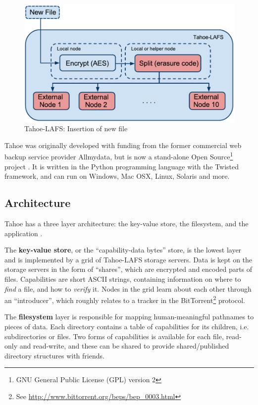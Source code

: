 \documentclass[english,12pt,a4paper]{book}
\begin{document}
\begin{figure}[h!]
    \centering
    \includegraphics[width=0.9\columnwidth]{Tahoe-newfile.pdf}
    \caption{Tahoe-LAFS: Insertion of new file}
    \label{fig:tahoeinsertion}
\end{figure}

Tahoe was originally developed with funding from the former commercial web
backup service provider Allmydata, but is now a stand-alone Open
Source\footnote{GNU General Public License (GPL) version 2} project
\cite{t_ars}.  It is written in the Python programming language with the Twisted
framework, and can run on Windows, Mac OSX, Linux, Solaris and more.

\subsection{Architecture}

Tahoe has a three layer architecture: the key-value store, the filesystem, and
the application \cite{t_tahoe}.

The \textbf{key-value store}, or the ``capability-data bytes'' store, is the
lowest layer and is implemented by a grid of Tahoe-LAFS storage servers. Data is
kept on the storage servers in the form of ``shares'', which are encrypted and
encoded parts of files. Capabilities are short ASCII strings, containing
information on where to \emph{find} a file, and how to \emph{verify} it.
Nodes in the grid learn about each other through an ``introducer'', which
roughly relates to a tracker in the BitTorrent\footnote{See
\url{http://www.bittorrent.org/beps/bep\_0003.html}} protocol.

The \textbf{filesystem} layer is responsible for mapping human-meaningful
pathnames to pieces of data. Each directory contains a table of capabilities
for its children, i.e. subdirectories or files. Two forms of capabilities is
available for each file, read-only and read-write, and these can be shared to
provide shared/published directory structures with friends.
\end{document}

